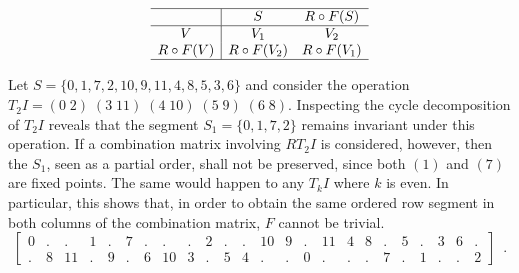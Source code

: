 \begin{equation}
\begin{array}{c|cc}
	\hline
    & S & R \circ F(S) \\
    \hline
    V & V_1 & V_2 \\
    R \circ F(V) & R \circ F(V_2) & R \circ F(V_1) \\
    \hline
\end{array}
\label{eq:derivation-retrograde}
\end{equation}

\vspace{12pt}

\begin{example}
    \cite[212]{Starr1984}
    \label{ex:derivation-unordered}
    Let $S = \{ 0, 1, 7, 2, 10, 9, 11, 4, 8, 5, 3, 6 \}$ and consider the operation $T_2I = (0 \; 2) \; (3 \; 11) \; (4 \; 10) \; (5 \; 9) \; (6 \; 8)$. Inspecting the cycle decomposition of $T_2I$ reveals that the segment $S_1 = \{ 0, 1, 7, 2 \}$ remains invariant under this operation. If a combination matrix involving $RT_2I$ is considered, however, then the $S_1$, seen as a partial order, shall not be preserved, since both $(1)$ and $(7)$ are fixed points. The same would happen to any $T_kI$ where $k$ is even. In particular, this shows that, in order to obtain the same ordered row segment in both columns of the combination matrix, $F$ cannot be trivial.
	\begin{equation}
    	\left[
    	\begin{array}{cccccccccccc|cccccccccccc}
        	0 & . & . & 1 & . & 7 & . & . & . & 2 & . & . & 10 & 9 & . & 11 & 4 & 8 & . & 5 & . & 3 & 6 & . \\
        	. & 8 & 11 & . & 9 & . & 6 & 10 & 3 & . & 5 & 4 & . & . & 0 & . & . & . & 7 & . & 1 & . & . & 2
    	\end{array}
    	\right] \enspace.
	\end{equation}
\end{example}

